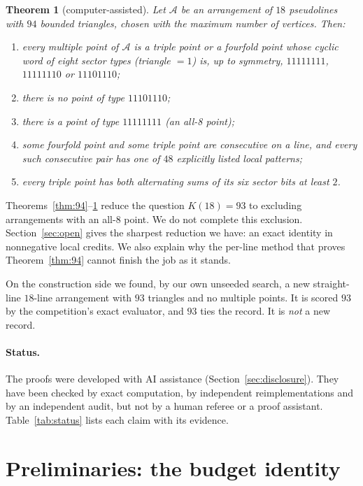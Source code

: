 \documentclass[11pt]{article}
\newtheorem{theorem}{Theorem}
\theoremstyle{definition}
\theoremstyle{remark}
\begin{document}
\begin{theorem}[computer-assisted]\label{thm:structure}
Let $\mathcal A$ be an arrangement of $18$ pseudolines with $94$ bounded triangles, chosen with the maximum number of
vertices. Then:
\begin{enumerate}[nosep,label=(\alph*)]
\item every multiple point of $\mathcal A$ is a triple point or a fourfold point whose cyclic word of eight sector
types (triangle $=1$) is, up to symmetry, $11111111$, $11111110$ or $11101110$;
\item there is no point of type $11101110$;
\item there is a point of type $11111111$ (an \emph{all-8 point});
\item some fourfold point and some triple point are consecutive on a line, and every such consecutive pair has one of
$48$ explicitly listed local patterns;
\item every triple point has both alternating sums of its six sector bits at least $2$.
\end{enumerate}
\end{theorem}

Theorems~\ref{thm:94}--\ref{thm:structure} reduce the question $K(18)=93$ to excluding arrangements with an all-8
point. We do not complete this exclusion. Section~\ref{sec:open} gives the sharpest reduction we have: an exact
identity in nonnegative local credits. We also explain why the per-line method that proves
Theorem~\ref{thm:94} cannot finish the job as it stands.

On the construction side we found, by our own unseeded search, a new straight-line $18$-line arrangement with $93$
triangles and no multiple points. It is scored $93$ by the competition's exact evaluator, and $93$ ties the record.
It is \emph{not} a new record.

\paragraph{Status.} The proofs were developed with AI assistance (Section~\ref{sec:disclosure}). They have been checked
by exact computation, by independent reimplementations and by an independent audit, but not by a human referee or a
proof assistant. Table~\ref{tab:status} lists each claim with its evidence.

\section{Preliminaries: the budget identity}
\end{document}
